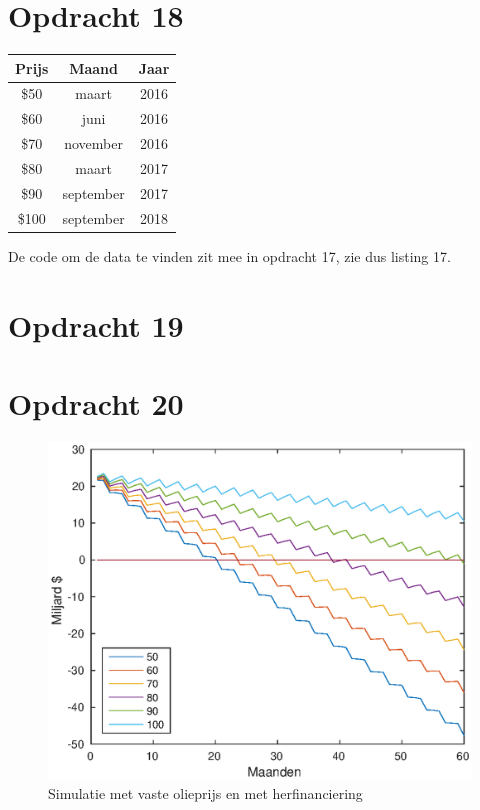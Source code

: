 \documentclass[11pt,a4paper]{article}
\begin{document}


\section*{Opdracht 18}
\begin{table}[H]
\centering
\begin{tabular}{c|c|c}
Prijs & Maand & Jaar\\
\hline
\$50 & maart & 2016\\
\$60 & juni & 2016\\
\$70 & november & 2016\\
\$80 & maart & 2017\\
\$90 & september & 2017\\
\$100 & september & 2018\\
\end{tabular}
\end{table}
De code om de data te vinden zit mee in opdracht 17, zie dus listing 17.
\section*{Opdracht 19}



\section*{Opdracht 20}

\begin{figure}[H]
\centering
\includegraphics[scale=0.75]{opdracht20}
\caption{Simulatie met vaste olieprijs en met herfinanciering}
\end{figure}
\end{document}
